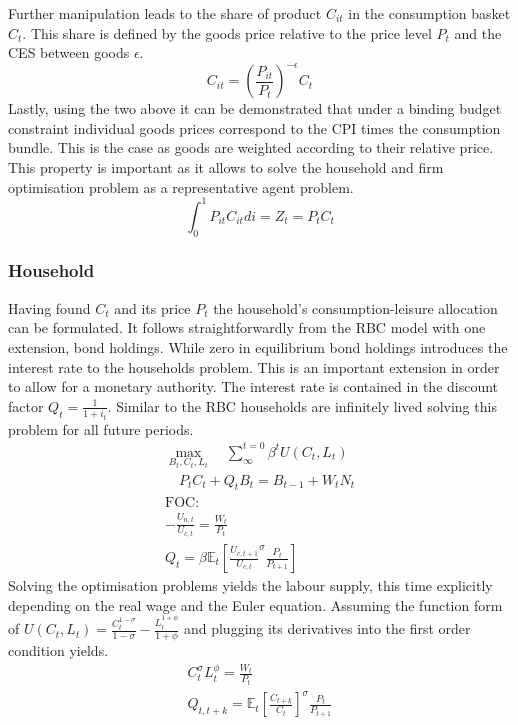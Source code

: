 \documentclass[12pt,a4paper,english]{article} %
\newcommand{\E}{\mathbb{E}} %
\begin{document}
	Further manipulation leads to the share of product $C_{it}$ in the consumption basket $C_t$. This share is defined by the goods price relative to the price level $P_t$ and the CES between goods $\epsilon$.
	\begin{equation} \label{eq: cshare}
		C_{it} = \left( \frac{P_{it}}{P_t} \right)^{- \epsilon} C_t
	\end{equation}
	Lastly, using the two above it can be demonstrated that under a binding budget constraint individual goods prices correspond to the CPI times the consumption bundle. This is the case as goods are weighted according to their relative price. This property is important as it allows to solve the household and firm optimisation problem as a representative agent problem.
	\begin{equation}
		\int_{0}^{1} P_{it} C_{it} di = Z_t = P_t C_t
	\end{equation}

	\subsubsection{Household}
	Having found $C_t$ and its price $P_t$ the household's consumption-leisure allocation can be formulated. It follows straightforwardly from the RBC model with one extension, bond holdings. While zero in equilibrium bond holdings introduces the interest rate to the households problem. This is an important extension in order to allow for a monetary authority. The interest rate is contained in the discount factor $Q_t = \frac{1}{1+i_t}$.
	Similar to the RBC households are infinitely lived solving this problem for all future periods. 
	\begin{equation}
		\begin{aligned}
			\max_{B_t, C_t, L_t} \quad \sum_{\infty}^{t=0} \beta^{t} U(C_{t}, L_{t}) \\
			\quad P_t C_t + Q_t B_t = B_{t-1} + W_t N_t \\
			\textrm{FOC:} \\
				- \frac{U_{n,t}}{U_{c, t}} = \frac{W_t}{P_t}\\
				Q_t = \beta \E_t \left[ \frac{U_{c, t+1}}{U_{c,t}}^\sigma \frac{P_t}{P_{t+1}} \right] 			
		\end{aligned}
	\end{equation}
	Solving the optimisation problems yields the labour supply, this time explicitly depending on the real wage and the Euler equation. Assuming the function form of $		U(C_t, L_t) = \frac{C_t^{1-\sigma}}{{1-\sigma}} - \frac{L_t^{1+\phi}}{1+\phi}$ and plugging its derivatives into the first order condition yields.
		\begin{equation} \label{eq:nk_hh_foc}
		\begin{aligned}
			C_t^\sigma L_t^\phi	= \frac{W_t}{P_t} \\
			Q_{t,t+k} = \E_t \left[ \frac{C_{t+k}}{C_t} \right]^\sigma \frac{P_t}{P_{t+1}}
		\end{aligned}
	\end{equation}
		
\end{document}
